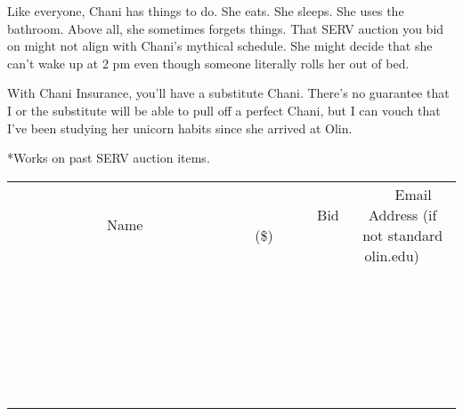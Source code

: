 \documentclass[11pt]{article}
\begin{document}
Like everyone, Chani has things to do. She eats. She sleeps. She uses the bathroom. Above all, she sometimes forgets things. That SERV auction you bid on might not align with Chani's mythical schedule. She might decide that she can't wake up at 2 pm even though someone literally rolls her out of bed.

With Chani Insurance, you'll have a substitute Chani. There's no guarantee that I or the substitute will be able to pull off a perfect Chani, but I can vouch that I've been studying her unicorn habits since she arrived at Olin.

*Works on past SERV auction items.
\\[6ex]
\begin{tabular}{c c c}
~~~~~~~~~~~~~Name~~~~~~~~~~~~~ & ~~~~~~~~~Bid (\$)~~~~~~~~~  & ~~~Email Address (if not standard olin.edu)~~~\\
 & & \\
\hline
 & & \\
\hline
 & & \\
\hline
 & & \\
\hline
 & & \\
\hline
 & & \\
\hline
 & & \\
\hline
 & & \\
\hline
 & & \\
\hline
 & & \\
\hline
 & & \\
\hline
 & & \\
\hline
 & & \\
\hline
 & & \\
\hline
 & & \\
\hline
 & & \\
\hline
 & & \\
\hline
 & & \\
\hline
 & & \\
\hline
 & & \\
\hline
 & & \\
\hline
 & & \\
\hline
 & & \\
\hline
 & & \\
\hline
 & & \\
\hline
 & & \\
\hline
\end{tabular}
\newpage
\end{document}
